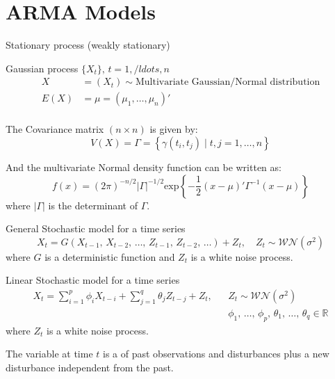 \section{ARMA Models}

\begin{definition}{Stationary process (weakly stationary)}{}
    
    Gaussian process $\{X_t\},\,t=1,/ldots,n$
    \begin{align*}
        X &= (X_t) \sim \text{Multivariate Gaussian/Normal distribution} \\
        E(X) &= \mu = \left( \mu_1, \ldots, \mu_n \right)' \\
    \end{align*}

    The Covariance matrix $(n \times n)$ is given by:
    \begin{equation*}
        V(X) = \Gamma = \left\{ \gamma(t_i,t_j) \mid t,j = 1,\ldots,n\right\}
    \end{equation*}

    And the multivariate Normal density function can be written as:
    \begin{equation*}
        f(x) = (2\pi)^{-n/2} |\Gamma|^{-1/2} \text{exp}\left\{ -\frac{1}{2}(x-\mu)' \Gamma^{-1} (x-\mu) \right\}
    \end{equation*}
    where $|\Gamma|$ is the determinant of $\Gamma$.
\end{definition}

\begin{definition}{General Stochastic model for a time series}{}
    \begin{equation*}
        X_t = G\left(
            X_{t-1},\,X_{t-2},\,\ldots,\,Z_{t-1},\,Z_{t-2},\,\ldots
        \right) + Z_t, \quad Z_t \sim \mathcal{WN}(\sigma^2)
    \end{equation*}
    where $G$ is a deterministic function and $Z_t$ is a white noise process.
\end{definition}

\begin{definition}{Linear Stochastic model for a time series}{}
    \begin{align*}
        X_t = \sum_{i=1}^p \phi_i X_{t-i} + \sum_{j=1}^q \theta_j Z_{t-j} + Z_t, &&Z_t \sim \mathcal{WN}(\sigma^2) \\
        && \phi_1,\,\ldots,\,\phi_p,\,\theta_1,\,\ldots,\,\theta_q \in \mathbb{R}
    \end{align*}
    where $Z_t$ is a white noise process.

    The variable at time $t$ is a  of past observations
    and disturbances plus a new disturbance independent from the past.
\end{definition}

